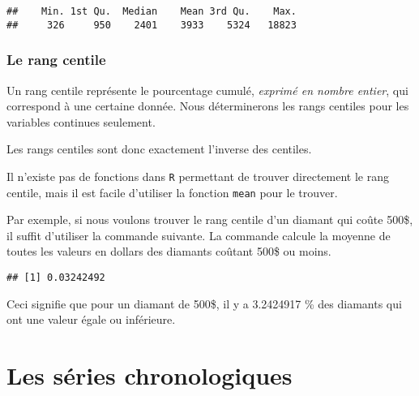 \documentclass[]{book}
\newenvironment{Shaded}{\begin{snugshade}}{\end{snugshade}}
\newcommand{\KeywordTok}[1]{\textcolor[rgb]{0.13,0.29,0.53}{\textbf{#1}}}
\newcommand{\DecValTok}[1]{\textcolor[rgb]{0.00,0.00,0.81}{#1}}
\newcommand{\OperatorTok}[1]{\textcolor[rgb]{0.81,0.36,0.00}{\textbf{#1}}}
\newcommand{\NormalTok}[1]{#1}
\begin{document}
\begin{Shaded}
\end{Shaded}

\begin{verbatim}
##    Min. 1st Qu.  Median    Mean 3rd Qu.    Max. 
##     326     950    2401    3933    5324   18823
\end{verbatim}

\subsection{Le rang centile}\label{le-rang-centile}

Un rang centile représente le pourcentage cumulé, \emph{exprimé en
nombre entier}, qui correspond à une certaine donnée. Nous déterminerons
les rangs centiles pour les variables continues seulement.

Les rangs centiles sont donc exactement l'inverse des centiles.

Il n'existe pas de fonctions dans \texttt{R} permettant de trouver
directement le rang centile, mais il est facile d'utiliser la fonction
\texttt{mean} pour le trouver.

Par exemple, si nous voulons trouver le rang centile d'un diamant qui
coûte 500\$, il suffit d'utiliser la commande suivante. La commande
calcule la moyenne de toutes les valeurs en dollars des diamants coûtant
500\$ ou moins.

\begin{Shaded}
\end{Shaded}

\begin{verbatim}
## [1] 0.03242492
\end{verbatim}

Ceci signifie que pour un diamant de 500\$, il y a 3.2424917 \% des
diamants qui ont une valeur égale ou inférieure.

\chapter{Les séries chronologiques}\label{les-series-chronologiques}
\end{document}
